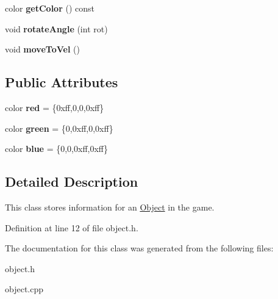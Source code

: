 \begin{DoxyCompactItemize}
\item 
color {\bfseries get\+Color} () const \hypertarget{classObject_ad52c4bd668636e18483c1a47b21cd695}{}\label{classObject_ad52c4bd668636e18483c1a47b21cd695}

\item 
void {\bfseries rotate\+Angle} (int rot)\hypertarget{classObject_aea24881ca647d6ccf7d89fd2735c1969}{}\label{classObject_aea24881ca647d6ccf7d89fd2735c1969}

\item 
void {\bfseries move\+To\+Vel} ()\hypertarget{classObject_acb93016fa37730252cf35fa282e5a3c3}{}\label{classObject_acb93016fa37730252cf35fa282e5a3c3}

\end{DoxyCompactItemize}
\subsection*{Public Attributes}
\begin{DoxyCompactItemize}
\item 
color {\bfseries red} = \{0xff,0,0,0xff\}\hypertarget{classObject_af614f0ca72ca572b74886552bb8aa19b}{}\label{classObject_af614f0ca72ca572b74886552bb8aa19b}

\item 
color {\bfseries green} = \{0,0xff,0,0xff\}\hypertarget{classObject_a8f5119ace90c47b3d20d19b41027f85c}{}\label{classObject_a8f5119ace90c47b3d20d19b41027f85c}

\item 
color {\bfseries blue} = \{0,0,0xff,0xff\}\hypertarget{classObject_a4bfc5def477cc3d742b571d65f043fa4}{}\label{classObject_a4bfc5def477cc3d742b571d65f043fa4}

\end{DoxyCompactItemize}


\subsection{Detailed Description}
This class stores information for an \hyperlink{classObject}{Object} in the game. 

Definition at line 12 of file object.\+h.



The documentation for this class was generated from the following files\+:\begin{DoxyCompactItemize}
\item 
object.\+h\item 
object.\+cpp\end{DoxyCompactItemize}
